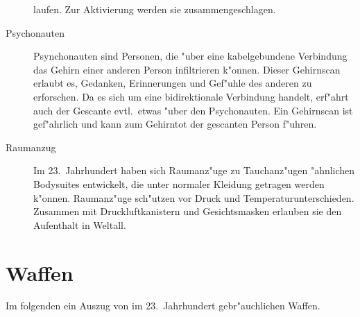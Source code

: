 \begin{appendices}
\begin{description}
      laufen. Zur Aktivierung werden sie zusammengeschlagen.
\item [Psychonauten] Psynchonauten sind Personen, die "uber eine kabelgebundene Verbindung das Gehirn
      einer anderen Person infiltrieren k"onnen. Dieser Gehirnscan erlaubt es, Gedanken, Erinnerungen und Gef"uhle des anderen zu erforschen. Da es sich um eine bidirektionale Verbindung handelt, erf"ahrt auch der Gescante evtl.~etwas "uber den Psychonauten. Ein Gehirnscan ist gef"ahrlich und kann zum Gehirntot der gescanten Person f"uhren.
\item [Raumanzug] Im 23.~Jahrhundert haben sich Raumanz"uge zu Tauchanz"ugen "ahnlichen Bodysuites entwickelt, die unter
      normaler Kleidung getragen werden k"onnen. Raumanz"uge sch"utzen vor Druck und Temperaturunterschieden. Zusammen mit Druckluftkanistern und Gesichtsmasken erlauben sie den Aufenthalt in Weltall.
\end{description}

\section{Waffen}

Im folgenden ein Auszug von im 23.~Jahrhundert gebr"auchlichen Waffen.



\end{appendices}
